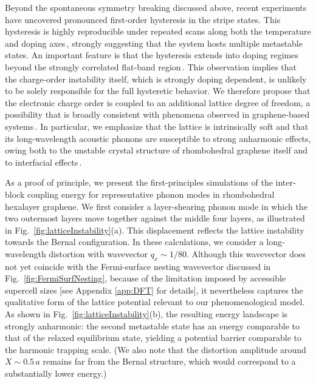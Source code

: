 \documentclass[aps,prx,article,twocolumn,amsmath,amssymb,superscriptaddress,longbibliography]{revtex4-2}
\begin{document}
Beyond the spontaneous symmetry breaking discussed above, recent experiments have uncovered pronounced first-order hysteresis in the stripe states. This hysteresis is highly reproducible under repeated scans along both the temperature and doping axes\,\cite{qin2025extreme, zhao2026hysteretical}, strongly suggesting that the system hosts multiple metastable states. An important feature is that the hysteresis extends into doping regimes beyond the strongly correlated flat-band region\,\cite{zhao2026hysteretical}. This observation implies that the charge-order instability itself, which is strongly doping dependent, is unlikely to be solely responsible for the full hysteretic behavior. We therefore propose that the electronic charge order is coupled to an additional lattice degree of freedom, a possibility that is broadly consistent with phenomena observed in graphene-based systems\,\cite{zan2024electron,chen2024strong,li2024evolution,birkbeck2025quantum,chen2018emergence, na2019direct}. In particular, we emphasize that the lattice is intrinsically soft and that its long-wavelength acoustic phonons are susceptible to strong anharmonic effects, owing both to the unstable crystal structure of rhombohedral graphene itself and to interfacial effects\,\cite{singh2026stacking}. 

As a proof of principle, we present the first-principles simulations of the inter-block coupling energy for representative phonon modes in rhombohedral hexalayer graphene. We first consider a layer-shearing phonon mode in which the two outermost layers move together against the middle four layers, as illustrated in Fig.~\ref{fig:latticeInstability}(a). This displacement reflects the lattice instability towards the Bernal configuration. In these calculations, we consider a long-wavelength distortion with wavevector $q_x\sim 1/80$. Although this wavevector does not yet coincide with the Fermi-surface nesting wavevector discussed in Fig.~\ref{fig:FermiSurfNesting}, because of the limitation imposed by accessible supercell sizes [see Appendix \ref{app:DFT} for details], it nevertheless captures the qualitative form of the lattice potential relevant to our phenomenological model. As shown in Fig.~\ref{fig:latticeInstability}(b), the resulting energy landscape is strongly anharmonic: the second metastable state has an energy comparable to that of the relaxed equilibrium state, yielding a potential barrier comparable to the harmonic trapping scale. (We also note that the distortion amplitude around $X \sim 0.5\,a$ remains far from the Bernal structure, which would correspond to a substantially lower energy.)  
\end{document}
